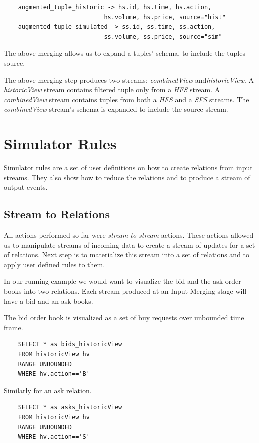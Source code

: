 \documentclass{article}
\begin{document}
\begin{verbatim}
    augmented_tuple_historic -> hs.id, hs.time, hs.action,
                            hs.volume, hs.price, source="hist"
    augmented_tuple_simulated -> ss.id, ss.time, ss.action,
                            ss.volume, ss.price, source="sim"
\end{verbatim}

The above merging allows us to expand a tuples' schema, to include the tuples source. 

The above merging step produces two streams: \emph{combinedView} and\emph{historicView}. A \emph{historicView} stream contains filtered tuple only from a \emph{HFS} stream. A \emph{combinedView} stream contains tuples from both a \emph{HFS} and a \emph{SFS} streams. The \emph{combinedView} stream's schema is expanded to include the source stream.


\section{Simulator Rules}

Simulator rules are a set of user definitions on how to create relations from input streams. They also show how to reduce the relations and to produce a stream of output events.

\subsection{Stream to Relations}
All actions performed so far were \emph{stream-to-stream} actions. These actions allowed us to manipulate streams of incoming data to create a stream of updates for a set of relations. Next step is to materialize this stream into a set of relations and to apply user defined rules to them. 

In our running example we would want to visualize the bid and the ask order books into two relations. Each stream produced at an Input Merging stage will have a bid and an ask books.

The bid order book is visualized as a set of buy requests over unbounded time frame.

\begin{verbatim}  
    SELECT * as bids_historicView
    FROM historicView hv
    RANGE UNBOUNDED
    WHERE hv.action=='B'
\end{verbatim}

\noindent Similarly for an ask relation.

\begin{verbatim}  
    SELECT * as asks_historicView
    FROM historicView hv
    RANGE UNBOUNDED
    WHERE hv.action=='S'
\end{verbatim}
\end{document}
